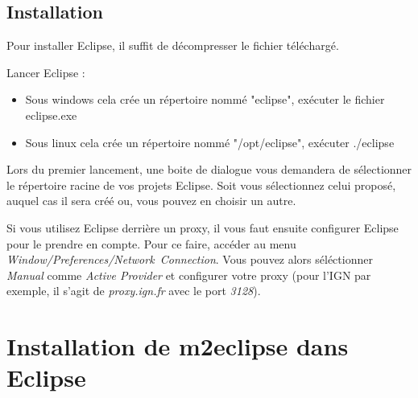 \subsection{Installation}
Pour installer Eclipse, il suffit de décompresser le fichier téléchargé. 

\bigskip

Lancer Eclipse :
\begin{itemize}
\item Sous windows cela crée un répertoire nommé "eclipse", exécuter le fichier eclipse.exe
\item Sous linux cela crée un répertoire nommé "/opt/eclipse", exécuter ./eclipse
\end{itemize}

Lors du premier lancement, une boite de dialogue vous demandera de sélectionner le répertoire racine de vos projets Eclipse. Soit vous sélectionnez celui proposé, auquel cas il sera créé ou, vous pouvez en choisir un autre.

\bigskip

Si vous utilisez Eclipse derrière un proxy, il vous faut ensuite configurer Eclipse pour le prendre en compte. Pour ce faire, accéder au menu \emph{Window/Preferences/Network~Connection}. Vous pouvez alors séléctionner \emph{Manual} comme \emph{Active Provider} et configurer votre proxy (pour l'IGN par exemple, il s'agit de \emph{proxy.ign.fr} avec le port \emph{3128}).

\section{Installation de m2eclipse dans Eclipse}



